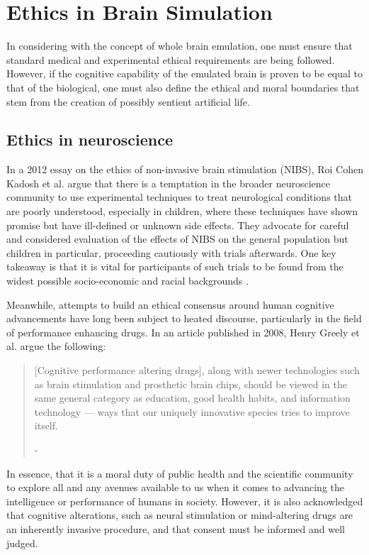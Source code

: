 \section{Ethics in Brain Simulation}

In considering with the concept of whole brain emulation, one must ensure that
standard medical and experimental ethical requirements are being followed.
However, if the cognitive capability of the emulated brain is proven to be equal
to that of the biological, one must also define the ethical and moral boundaries
that stem from the creation of possibly sentient artificial life. 

\subsection{Ethics in neuroscience}

In a 2012 essay on the ethics of non-invasive brain stimulation (NIBS), Roi
Cohen Kadosh et al. argue that there is a temptation in the broader neuroscience
community to use experimental techniques to treat neurological conditions that
are poorly understood, especially in children, where these techniques have shown
promise but have ill-defined or unknown side effects. They advocate for careful
and considered evaluation of the effects of NIBS on the general population but
children in particular, proceeding cautiously with trials afterwards. One key
takeaway is that it is vital for participants of such trials to be found from
the widest possible socio-economic and racial backgrounds
\autocite{kadosh_neuroethics_2012}. 

Meanwhile, attempts to build an ethical consensus around human cognitive
advancements have long been subject to heated discourse, particularly in the
field of performance enhancing drugs. In an article published in 2008, Henry
Greely et al. argue the following:

\begin{quote}
    [Cognitive performance altering drugs], along with newer technologies such
    as brain stimulation and prosthetic brain chips, should be viewed in the
    same general category as education, good health habits, and information
    technology — ways that our uniquely innovative species tries to improve
    itself.
    \begin{flushright}
        -\textit{\autocite{greely_towards_2008}}
    \end{flushright}
\end{quote}

In essence, that it is a moral duty of public health and the scientific
community to explore all and any avenues available to us when it comes to
advancing the intelligence or performance of humans in society. However, it is
also acknowledged that cognitive alterations, such as neural stimulation or
mind-altering drugs are an inherently invasive procedure, and that consent must
be informed and well judged. 

